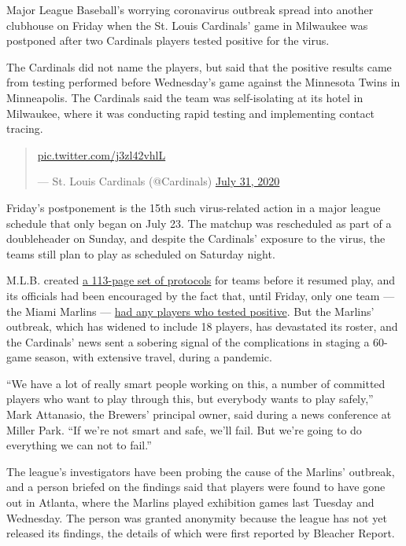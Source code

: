 Major League Baseball's worrying coronavirus outbreak spread into
another clubhouse on Friday when the St. Louis Cardinals' game in
Milwaukee was postponed after two Cardinals players tested positive for
the virus.

The Cardinals did not name the players, but said that the positive
results came from testing performed before Wednesday's game against the
Minnesota Twins in Minneapolis. The Cardinals said the team was
self-isolating at its hotel in Milwaukee, where it was conducting rapid
testing and implementing contact tracing.

\begin{quote}
\href{https://t.co/j3zl42vhlL}{pic.twitter.com/j3zl42vhlL}

--- St. Louis Cardinals (@Cardinals)
\href{https://twitter.com/Cardinals/status/1289243222456201216?ref_src=twsrc\%5Etfw}{July
31, 2020}
\end{quote}

Friday's postponement is the 15th such virus-related action in a major
league schedule that only began on July 23. The matchup was rescheduled
as part of a doubleheader on Sunday, and despite the Cardinals' exposure
to the virus, the teams still plan to play as scheduled on Saturday
night.

M.L.B. created
\href{https://www.nytimes3xbfgragh.onion/2020/06/22/sports/baseball/mlb-season-schedule-vote.html}{a
113-page set of protocols} for teams before it resumed play, and its
officials had been encouraged by the fact that, until Friday, only one
team --- the Miami Marlins ---
\href{https://www.nytimes3xbfgragh.onion/2020/07/27/sports/baseball/marlins-game-canceled.html}{had
any players who tested positive}. But the Marlins' outbreak, which has
widened to include 18 players, has devastated its roster, and the
Cardinals' news sent a sobering signal of the complications in staging a
60-game season, with extensive travel, during a pandemic.

``We have a lot of really smart people working on this, a number of
committed players who want to play through this, but everybody wants to
play safely,'' Mark Attanasio, the Brewers' principal owner, said during
a news conference at Miller Park. ``If we're not smart and safe, we'll
fail. But we're going to do everything we can not to fail.''

The league's investigators have been probing the cause of the Marlins'
outbreak, and a person briefed on the findings said that players were
found to have gone out in Atlanta, where the Marlins played exhibition
games last Tuesday and Wednesday. The person was granted anonymity
because the league has not yet released its findings, the details of
which were first reported by Bleacher Report.

